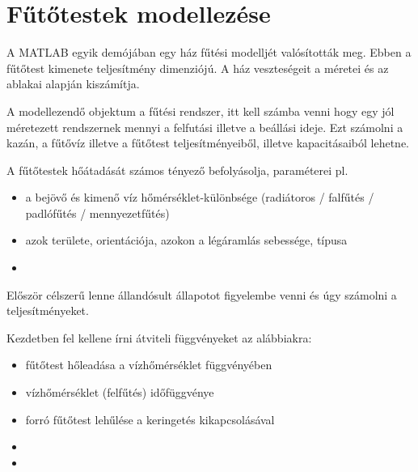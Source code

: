 \section{Fűtőtestek modellezése}

A MATLAB egyik demójában egy ház fűtési modelljét valósították meg.
Ebben a fűtőtest kimenete teljesítmény dimenziójú. 
A ház veszteségeit a méretei és az ablakai alapján kiszámítja.

A modellezendő objektum a fűtési rendszer, itt kell számba venni hogy egy jól méretezett rendszernek mennyi a felfutási illetve a beállási ideje. Ezt számolni a kazán, a fűtővíz illetve a fűtőtest teljesítményeiből, illetve kapacitásaiból lehetne.

A fűtőtestek hőátadását számos tényező befolyásolja, paraméterei pl.
\begin{itemize}[noitemsep,topsep=0pt,parsep=0pt,partopsep=0pt]
	\item a bejövő és kimenő víz hőmérséklet-különbsége (radiátoros / falfűtés / padlófűtés / mennyezetfűtés)
	\item azok területe, orientációja, azokon a légáramlás sebessége, típusa
	\item 
\end{itemize}

Először célszerű lenne állandósult állapotot figyelembe venni és úgy számolni a teljesítményeket.

Kezdetben fel kellene írni átviteli függvényeket az alábbiakra:

\begin{itemize}[noitemsep,topsep=0pt,parsep=0pt,partopsep=0pt]
	\item fűtőtest hőleadása a vízhőmérséklet függvényében
	\item vízhőmérséklet (felfűtés) időfüggvénye
	\item forró fűtőtest lehűlése a keringetés kikapcsolásával
	\item 
	\item 
\end{itemize}